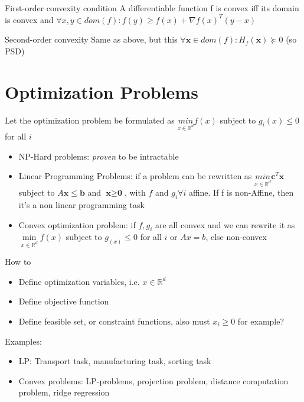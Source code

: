 \documentclass[a4paper]{article}
\begin{document}
\begin{mainbox}{First-order convexity condition}
    A differentiable function f is convex iff its domain is convex and $\forall x,y\in dom(f): f(y) \geq f(x) + \nabla f(x)^T (y-x)$ 
\end{mainbox}
\begin{subbox}{Second-order convexity}
    Same as above, but this $\forall \mathbf{x}\in dom(f) : H_f(\mathbf{x}) \succeq 0$ (so PSD)  
\end{subbox}


\section{Optimization Problems}
Let the optimization problem be formulated as $\underset{x\in\mathbb{R}^d}{min}f(x)$ subject to $g_i(x) \leq 0$ for all $i$   
\begin{itemize}
    \item NP-Hard problems: \textit{proven}  to be intractable
    \item  Linear Programming Problems: if a problem can be rewritten as $\underset{x\in\mathbb{R}^d}{min} \textbf{c} ^T\textbf{x} $ subject to $A\textbf{x}  \leq \textbf{b} $ and $\textbf{x} \geq\textbf{0} $, with $f$ and $g_i \forall i$ affine.   If f is non-Affine, then it's a non linear programming task
    \item Convex optimization problem: if $f, g_i$ are all convex and we can rewrite it as $\underset{x\in\mathbb{R}^d}{\min}f(x) $ subject to $g_(x) \leq 0$ for all $i$ or $Ax=b$, else non-convex  
\end{itemize}

\begin{mainbox}{How to}
    \begin{itemize}
        \item Define optimization variables, i.e. $x\in\mathbb{R}^d$
        \item Define objective function 
        \item Define feasible set, or constraint functions, also must $x_i \geq 0$ for example? 
    \end{itemize}
    
\end{mainbox}

Examples:
\begin{itemize}
    \item LP: Transport task, manufacturing task, sorting task
    \item Convex problems: LP-problems, projection problem, distance computation problem, ridge regression
\end{itemize}
\end{document}
